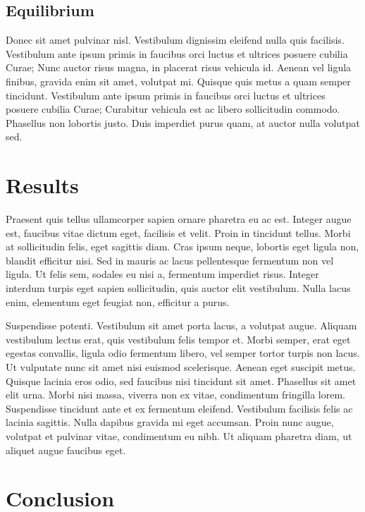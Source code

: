 \subsection{Equilibrium}

Donec sit amet pulvinar nisl. Vestibulum dignissim eleifend nulla quis facilisis. Vestibulum ante ipsum primis in faucibus orci luctus et ultrices posuere cubilia Curae; Nunc auctor risus magna, in placerat risus vehicula id. Aenean vel ligula finibus, gravida enim sit amet, volutpat mi. Quisque quis metus a quam semper tincidunt. Vestibulum ante ipsum primis in faucibus orci luctus et ultrices posuere cubilia Curae; Curabitur vehicula est ac libero sollicitudin commodo. Phasellus non lobortis justo. Duis imperdiet purus quam, at auctor nulla volutpat sed.

\section{Results}

Praesent quis tellus ullamcorper sapien ornare pharetra eu ac est. Integer augue est, faucibus vitae dictum eget, facilisis et velit. Proin in tincidunt tellus. Morbi at sollicitudin felis, eget sagittis diam. Cras ipsum neque, lobortis eget ligula non, blandit efficitur nisi. Sed in mauris ac lacus pellentesque fermentum non vel ligula. Ut felis sem, sodales eu nisi a, fermentum imperdiet risus. Integer interdum turpis eget sapien sollicitudin, quis auctor elit vestibulum. Nulla lacus enim, elementum eget feugiat non, efficitur a purus.

Suspendisse potenti. Vestibulum sit amet porta lacus, a volutpat augue. Aliquam vestibulum lectus erat, quis vestibulum felis tempor et. Morbi semper, erat eget egestas convallis, ligula odio fermentum libero, vel semper tortor turpis non lacus. Ut vulputate nunc sit amet nisi euismod scelerisque. Aenean eget suscipit metus. Quisque lacinia eros odio, sed faucibus nisi tincidunt sit amet. Phasellus sit amet elit urna. Morbi nisi massa, viverra non ex vitae, condimentum fringilla lorem. Suspendisse tincidunt ante et ex fermentum eleifend. Vestibulum facilisis felis ac lacinia sagittis. Nulla dapibus gravida mi eget accumsan. Proin nunc augue, volutpat et pulvinar vitae, condimentum eu nibh. Ut aliquam pharetra diam, ut aliquet augue faucibus eget.

\section{Conclusion}

